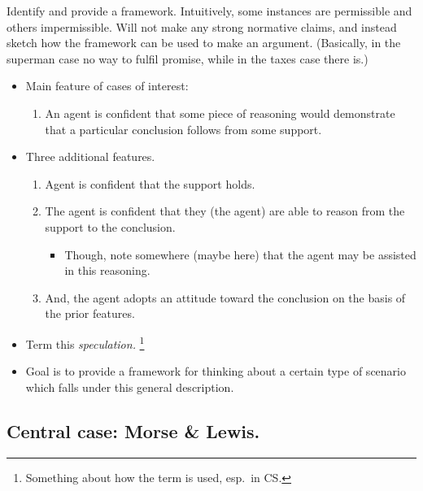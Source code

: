 \documentclass[10pt]{article}
\begin{document}
\begin{note}
  Identify and provide a framework.
  Intuitively, some instances are permissible and others impermissible.
  Will not make any strong normative claims, and instead sketch how the framework can be used to make an argument.
  (Basically, in the superman case no way to fulfil promise, while in the taxes case there is.)
\end{note}

\begin{itemize}
\item Main feature of cases of interest:
  \begin{enumerate}
  \item An agent is confident that some piece of reasoning would demonstrate that a particular conclusion follows from some support.
  \end{enumerate}
\item Three additional features.
  \begin{enumerate}[resume]
  \item Agent is confident that the support holds.
  \item The agent is confident that they (the agent) are able to reason from the support to the conclusion.
    \begin{itemize}
    \item Though, note somewhere (maybe here) that the agent may be assisted in this reasoning.
    \end{itemize}
  \item And, the agent adopts an attitude toward the conclusion on the basis of the prior features.
  \end{enumerate}
\item Term this \emph{speculation.}\nolinebreak
  \footnote{Something about how the term is used, esp.\ in CS.}
\item Goal is to provide a framework for thinking about a certain type of scenario which falls under this general description.
\end{itemize}

\subsection{Central case: Morse \& Lewis.}
\label{sec:central-case:-morse}
\end{document}
